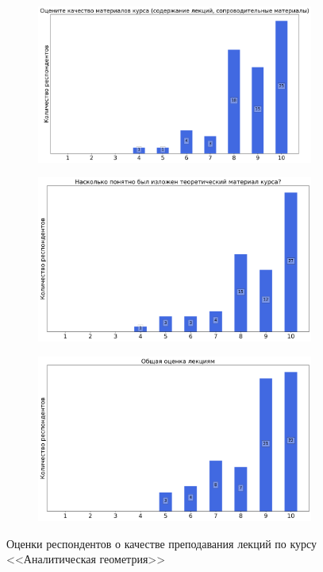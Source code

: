 \begin{figure}[H]
\begin{subfigure}[b]{0.45\textwidth}
			\end{subfigure}
			\begin{subfigure}[b]{0.45\textwidth}
				\centering
				\includegraphics[width=\textwidth]{images/1 course/Аналитическая геометрия/lecturer-marks-Чубаров И.А.-1.png}
			\end{subfigure}
			\begin{subfigure}[b]{0.45\textwidth}
				\centering
				\includegraphics[width=\textwidth]{images/1 course/Аналитическая геометрия/lecturer-marks-Чубаров И.А.-2.png}
			\end{subfigure}
			\begin{subfigure}[b]{0.45\textwidth}
				\centering
				\includegraphics[width=\textwidth]{images/1 course/Аналитическая геометрия/lecturer-marks-Чубаров И.А.-3.png}
			\end{subfigure}
			\caption{Оценки респондентов о качестве преподавания лекций по курсу <<Аналитическая геометрия>>}
		\end{figure}

